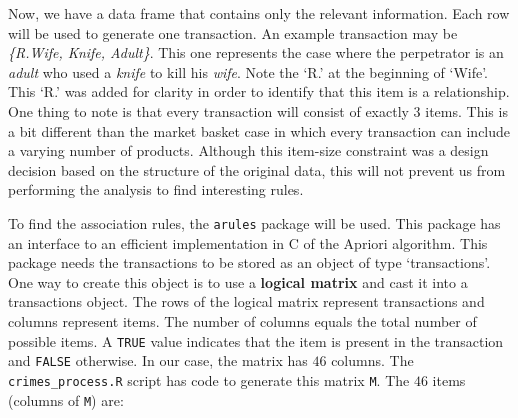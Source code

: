 \documentclass[
  11pt,
]{krantz}
\begin{document}
Now, we have a data frame that contains only the relevant information. Each row will be used to generate one transaction. An example transaction may be \emph{\{R.Wife, Knife, Adult\}}. This one represents the case where the perpetrator is an \emph{adult} who used a \emph{knife} to kill his \emph{wife}. Note the `R.' at the beginning of `Wife'. This `R.' was added for clarity in order to identify that this item is a relationship. One thing to note is that every transaction will consist of exactly \(3\) items. This is a bit different than the market basket case in which every transaction can include a varying number of products. Although this item-size constraint was a design decision based on the structure of the original data, this will not prevent us from performing the analysis to find interesting rules.

To find the association rules, the \texttt{arules} package \citep{arules} will be used. This package has an interface to an efficient implementation in C of the Apriori algorithm. This package needs the transactions to be stored as an object of type `transactions'. One way to create this object is to use a \textbf{logical matrix} and cast it into a transactions object. The rows of the logical matrix represent transactions and columns represent items. The number of columns equals the total number of possible items. A \texttt{TRUE} value indicates that the item is present in the transaction and \texttt{FALSE} otherwise. In our case, the matrix has \(46\) columns. The \texttt{crimes\_process.R} script has code to generate this matrix \texttt{M}. The \(46\) items (columns of \texttt{M}) are:
\end{document}
